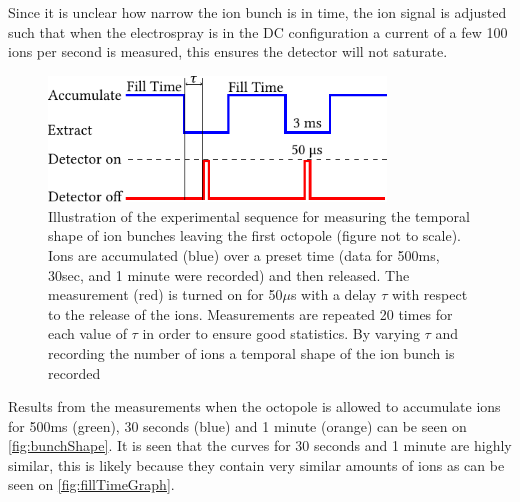 Since it is unclear how narrow the ion bunch is in time, the ion signal is adjusted such that when the electrospray is in the DC configuration a current of a few 100 ions per second is measured, this ensures the detector will not saturate.
\begin{figure}
    \centering
    \includegraphics[width = 0.8\textwidth]{main/ShapePulse.pdf}
    \caption{Illustration of the experimental sequence for measuring the temporal shape of ion bunches leaving the first octopole (figure not to scale). Ions are accumulated (blue) over a preset time (data for 500ms, 30sec, and 1 minute were recorded) and then released. The measurement (red) is turned on for 50$\mu$s with a delay $\tau$ with respect to the release of the ions.
    Measurements are repeated 20 times for each value of $\tau$ in order to ensure good statistics. By varying $\tau$ and recording the number of ions a temporal shape of the ion bunch is recorded}
    \label{fig:sequenceShape}
\end{figure}

Results from the measurements when the octopole is allowed to accumulate ions for 500ms (green), 30 seconds (blue) and 1 minute (orange) can be seen on 
\cref{fig:bunchShape}.
It is seen that the curves for 30 seconds and 1 minute are highly similar, this is likely because they contain very similar amounts of ions as can be seen on \cref{fig:fillTimeGraph}.

